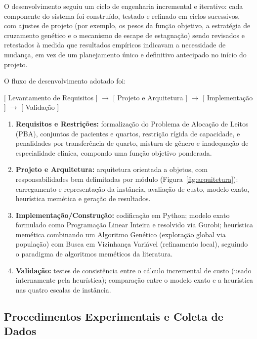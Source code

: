 \documentclass[12pt,a4paper]{article}
\begin{document}
O desenvolvimento seguiu um ciclo de engenharia incremental e iterativo:
cada componente do sistema foi construído, testado e refinado em ciclos sucessivos,
com ajustes de projeto (por exemplo, os pesos da função objetivo, a estratégia de
cruzamento genético e o mecanismo de escape de estagnação) sendo revisados e
retestados à medida que resultados empíricos indicavam a necessidade de mudança,
em vez de um planejamento único e definitivo antecipado no início do projeto.

O fluxo de desenvolvimento adotado foi:

\begin{center}
[ Levantamento de Requisitos ] $\rightarrow$ [ Projeto e Arquitetura ] $\rightarrow$
[ Implementação ] $\rightarrow$ [ Validação ]
\end{center}

\begin{enumerate}
    \item \textbf{Requisitos e Restrições:} formalização do Problema de Alocação de
    Leitos (PBA), conjuntos de pacientes e quartos, restrição rígida de capacidade,
    e penalidades por transferência de quarto, mistura de gênero e inadequação de
    especialidade clínica, compondo uma função objetivo ponderada.

    \item \textbf{Projeto e Arquitetura:} arquitetura orientada a objetos, com
    responsabilidades bem delimitadas por módulo (Figura~\ref{fig:arquitetura}):
    carregamento e representação da instância, avaliação de custo, modelo exato,
    heurística memética e geração de resultados.

    \item \textbf{Implementação/Construção:} codificação em Python; modelo exato
    formulado como Programação Linear Inteira e resolvido via Gurobi; heurística
    memética combinando um Algoritmo Genético (exploração global via população) com
    Busca em Vizinhança Variável (refinamento local), seguindo o paradigma de
    algoritmos meméticos da literatura.

    \item \textbf{Validação:} testes de consistência entre o cálculo
    incremental de custo (usado internamente pela heurística); comparação entre o modelo exato e a heurística nas quatro escalas de instância.
\end{enumerate}

\subsection{Procedimentos Experimentais e Coleta de Dados}
\end{document}
